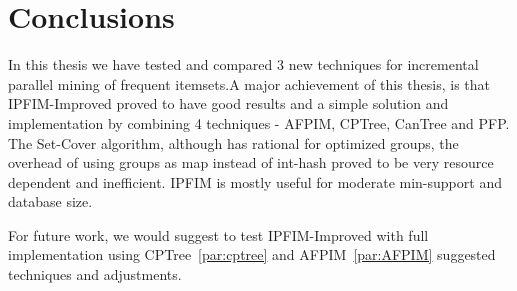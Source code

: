 \section{Conclusions}
\iffalse
For a single computation of frequent items, the benchmark for performance and memory for IPFIM, is PFP. This is because IPFIM is using similar techniques, and FP tree is the optimal structure for this purpose (except some variations mentioned in previous sections, e.g. optimal sharding).
As already mentioned in the \hyperref[sec:discussion]{\textit{discussion}} section, when there is a relatively equal ratio between reading a dataset and computation time of frequent item sets, IPFIM with the suggested improvements out performs PFP. However, for large FIS computation time, this advantage is negligible in total.

Using a canonical order approach, as in Cantree, was almost not practical for large data sets, nor for small min support calculations. The improvement of using a semi-frequency and pre-min support limitation, provides the best balance , and provides best performance.

For future work, it is interesting to enhance PFP to use "smart" grouping. For example trying to use greedy set cover to find groups for of frequent itemsets.
\fi

In this thesis we have tested and compared 3 new techniques for incremental parallel mining of frequent itemsets.A major achievement of this thesis, is that IPFIM-Improved proved to have good results and a simple solution and implementation by combining 4 techniques - AFPIM, CPTree, CanTree and PFP. The Set-Cover algorithm, although has rational for optimized groups, the overhead of using groups as map instead of int-hash proved to be very resource dependent and inefficient. IPFIM is mostly useful for moderate min-support and database size.

For future work, we would suggest to test IPFIM-Improved with full implementation using CPTree~\autoref{par:cptree} and AFPIM~\autoref{par:AFPIM} suggested techniques and adjustments.
